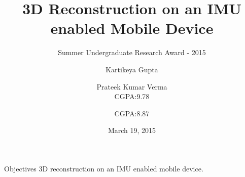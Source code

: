 \documentclass{beamer}
\title[3D reconstruction]{3D Reconstruction on an IMU enabled Mobile Device}
\subtitle{Summer Undergraduate Research Award - 2015}
\author[Kartikeya \and Prateek]{\hspace{.063\textwidth} Kartikeya Gupta \and Prateek Kumar Verma \\\small CGPA:9.78 \hspace{.1\textwidth} \and \small CGPA:8.87}
\institute[IITD] %
{
  Department of Computer Science and Engineering\\
  IIT Delhi
  \and
  Under supervision of \\
  \textbf{Prof. Subhashis Banerjee} \\
  Department of Computer Science and Engineering
}
\date{March 19, 2015}
\begin{document}
\begin{frame}
  \titlepage
\end{frame}




\begin{frame}{Objectives}{}
  3D reconstruction on an IMU enabled mobile device.
\end{frame}
\end{document}
